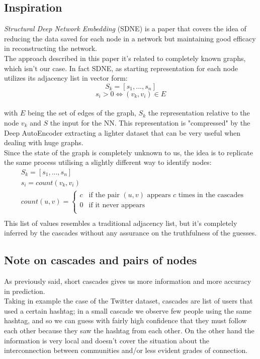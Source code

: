 \documentclass{article}
\begin{document}
			\subsection{Inspiration}
			\textit{Structural Deep Network Embedding} (SDNE) is a paper that covers the idea of reducing the data saved for each node in a network but maintaining good efficacy in reconstructing the network.\\
			The approach described in this paper it's related to completely known graphs, which isn't our case. In fact SDNE, as starting representation for each node utilizes its adjacency list in vector form:
			$$ S_{k} = [s_{1}, ... , s_{n}] $$
			$$ s_{i} > 0 \iff (v_{k},v_{i})\in E $$\\
			with $E$ being the set of edges of the graph, $S_{k}$ the representation relative to the node $v_{k}$ and $S$ the input for the NN. This representation is "compressed" by the Deep AutoEncoder extracting a lighter dataset that can be very useful when dealing with huge graphs.\\
			Since the state of the graph is completely unknown to us, the idea is to replicate the same process utilising a slightly different way to identify nodes:
			\begin{equation}
			\begin{aligned}
			& S_{k} = [s_{1}, ... , s_{n}]\\
			& s_{i} = count(v_{k},v_{i})\\
			& count(u,v) =
			\begin{cases}
			c & \text{if the pair } (u,v) \text{  appears } c \text{ times in the cascades}\\
			0 & \text{if it never appears}\\
			\end{cases}\\
			\end{aligned}
			\end{equation}
			This list of values resembles a traditional adjacency list, but it's completely inferred by the cascades without any assurance on the truthfulness of the guesses.\\
			
			\subsection{Note on cascades and pairs of nodes}
			As previously said, short cascades gives us more information and more accuracy in prediction.\\
			Taking in example the case of the Twitter dataset, cascades are list of users that used a certain hashtag; in a small cascade we observe few people using the same hashtag, and so we can guess with fairly high confidence that they must follow each other because they saw the hashtag from each other. On the other hand the information is very local and doesn't cover the situation about the interconnection between communities and/or less evident grades of connection.
			
			
		
\end{document}
